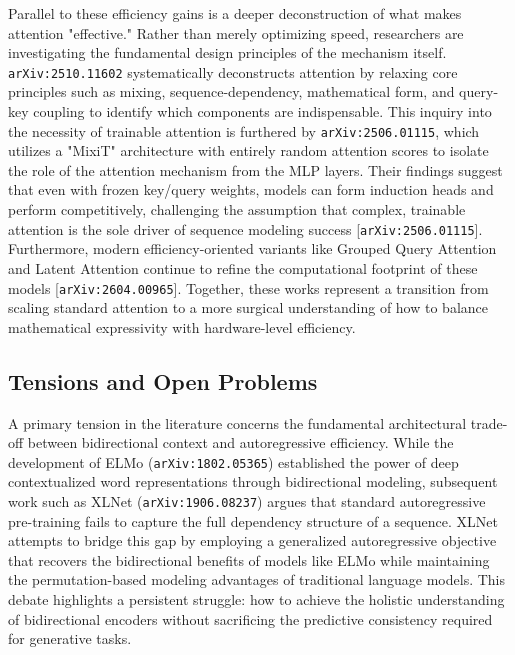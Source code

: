 \documentclass[11pt]{article}
\begin{document}
Parallel to these efficiency gains is a deeper deconstruction of what makes attention "effective." Rather than merely optimizing speed, researchers are investigating the fundamental design principles of the mechanism itself. \texttt{arXiv:2510.11602} systematically deconstructs attention by relaxing core principles such as mixing, sequence-dependency, mathematical form, and query-key coupling to identify which components are indispensable. This inquiry into the necessity of trainable attention is furthered by \texttt{arXiv:2506.01115}, which utilizes a "MixiT" architecture with entirely random attention scores to isolate the role of the attention mechanism from the MLP layers. Their findings suggest that even with frozen key/query weights, models can form induction heads and perform competitively, challenging the assumption that complex, trainable attention is the sole driver of sequence modeling success [\texttt{arXiv:2506.01115}]. Furthermore, modern efficiency-oriented variants like Grouped Query Attention and Latent Attention continue to refine the computational footprint of these models [\texttt{arXiv:2604.00965}]. Together, these works represent a transition from scaling standard attention to a more surgical understanding of how to balance mathematical expressivity with hardware-level efficiency.

\subsection{Tensions and Open Problems}

A primary tension in the literature concerns the fundamental architectural trade-off between bidirectional context and autoregressive efficiency. While the development of ELMo (\texttt{arXiv:1802.05365}) established the power of deep contextualized word representations through bidirectional modeling, subsequent work such as XLNet (\texttt{arXiv:1906.08237}) argues that standard autoregressive pre-training fails to capture the full dependency structure of a sequence. XLNet attempts to bridge this gap by employing a generalized autoregressive objective that recovers the bidirectional benefits of models like ELMo while maintaining the permutation-based modeling advantages of traditional language models. This debate highlights a persistent struggle: how to achieve the holistic understanding of bidirectional encoders without sacrificing the predictive consistency required for generative tasks.
\end{document}
